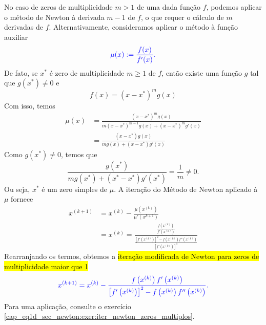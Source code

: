\begin{obs}\label{cap_eq1d_sec_newton:obs:zeros_multiplos}
  No caso de zeros de multiplicidade $m>1$ de uma dada função $f$, podemos aplicar o método de Newton à derivada $m-1$ de $f$, o que requer o cálculo de $m$ derivadas de $f$. Alternativamente, consideramos aplicar o método à função auxiliar
  \begin{equation}
    \color{blue}\mu(x) := \frac{f(x)}{f'(x)}.
  \end{equation}
  De fato, se $x^*$ é zero de multiplicidade $m\geq 1$ de $f$, então existe uma função $g$ tal que $g(x^*)\neq 0$ e
  \begin{equation}
    f(x) = \left(x-x^*\right)^mg(x)
  \end{equation}
  Com isso, temos
  \begin{align*}
    \mu(x) &= \frac{\left(x-x^*\right)^mg(x)}{m\left(x-x^*\right)^{m-1}g(x)+\left(x-x^*\right)^mg'(x)}\\
           &= \frac{\left(x-x^*\right)g(x)}{mg(x) + \left(x-x^*\right)g'(x)}
  \end{align*}
  Como $g\left(x^*\right)\neq 0$, temos que
  \begin{equation}
    \frac{g(x^*)}{mg\left(x^*\right) + \left(x^*-x^*\right)g'\left(x^*\right)} = \frac{1}{m}\neq 0.
  \end{equation}
  Ou seja, $x^*$ é um zero simples de $\mu$. A iteração do Método de Newton aplicado à $\mu$ fornece
  \begin{align}
    x^{(k+1)} &= x^{(k)} - \frac{\mu\left(x^{(k)}\right)}{\mu'\left(x^{k+1}\right)}\\
              &= x^{(k)} = \frac{\frac{f\left(x^{(k)}\right)}{f'\left(x^{(k)}\right)}}{\frac{\left[f'\left(x^{(k)}\right)\right]^2 - f\left(x^{(k)}\right)f''\left(x^{(k)}\right)}{\left[f'\left(x^{(k)}\right)\right]^2}}
  \end{align}
  Rearranjando os termos, obtemos a \hl{iteração modificada de Newton para zeros de multiplicidade maior que 1}
  \begin{equation}\label{cap_eq1d_sec_newton:eq:iter_newton_zero_multiplo}
    \color{blue}x^{(k+1)} = x^{(k)} - \frac{f\left(x^{(k)}\right)f'\left(x^{(k)}\right)}{\left[f'\left(x^{(k)}\right)\right]^2 - f\left(x^{(k)}\right)f''\left(x^{(k)}\right)}.
  \end{equation}
  Para uma aplicação, consulte o exercício \ref{cap_eq1d_sec_newton:exer:iter_newton_zeros_multiplos}.
\end{obs}

